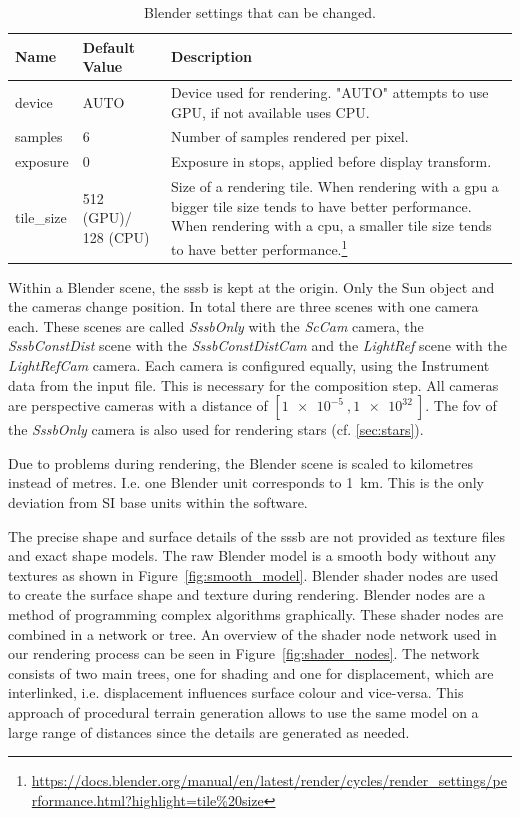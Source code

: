 \begin{table}[htb]
    \centering
    \caption{Blender settings that can be changed.}
    \label{tab:blender_settings_input}
        \begin{tabular}{p{}|p{}|p{}}
        \textbf{Name}       & \textbf{Default Value} & \textbf{Description} \\ \hline
        device     & AUTO          & Device used for rendering. "AUTO" attempts to use GPU, if not available uses CPU. \\
        samples    & 6             & Number of samples rendered per pixel.\\
        exposure   & 0             & Exposure in stops, applied before display transform. \\
        tile\_size & 512 (GPU)/ 128 (CPU)       & Size of a rendering tile. When rendering with a \gls{gpu} a bigger tile size tends to have better performance. When rendering with a \gls{cpu}, a smaller tile size tends to have better performance.\footnote{\url{https://docs.blender.org/manual/en/latest/render/cycles/render\_settings/performance.html?highlight=tile\%20size}}
    \end{tabular}
\end{table}

Within a Blender scene, the \gls{sssb} is kept at the origin. Only the Sun object and the cameras change position. In total there are three scenes with one camera each. These scenes are called \textit{SssbOnly} with the \textit{ScCam} camera, the \textit{SssbConstDist} scene with the \textit{SssbConstDistCam} and the \textit{LightRef} scene with the \textit{LightRefCam} camera. Each camera is configured equally, using the Instrument data from the input file. This is necessary for the composition step. All cameras are perspective cameras with a distance of $[\SI{1e-5}{},\SI{1e32}{}]$. The \gls{fov} of the \textit{SssbOnly} camera is also used for rendering stars (cf. \ref{sec:stars}).

Due to problems during rendering, the Blender scene is scaled to kilometres instead of metres. I.e. one Blender unit corresponds to \SI{1}{\kilo\meter}. This is the only deviation from SI base units within the software.

The precise shape and surface details of the \gls{sssb} are not provided as texture files and exact shape models. The raw Blender model is a smooth body without any textures as shown in Figure~\ref{fig:smooth_model}. Blender shader nodes are used to create the surface shape and texture during rendering. Blender nodes are a method of programming complex algorithms graphically. These shader nodes are combined in a network or tree. An overview of the shader node network used in our rendering process can be seen in Figure~\ref{fig:shader_nodes}. The network consists of two main trees, one for shading and one for displacement, which are interlinked, i.e. displacement influences surface colour and vice-versa. This approach of procedural terrain generation allows to use the same model on a large range of distances since the details are generated as needed.

